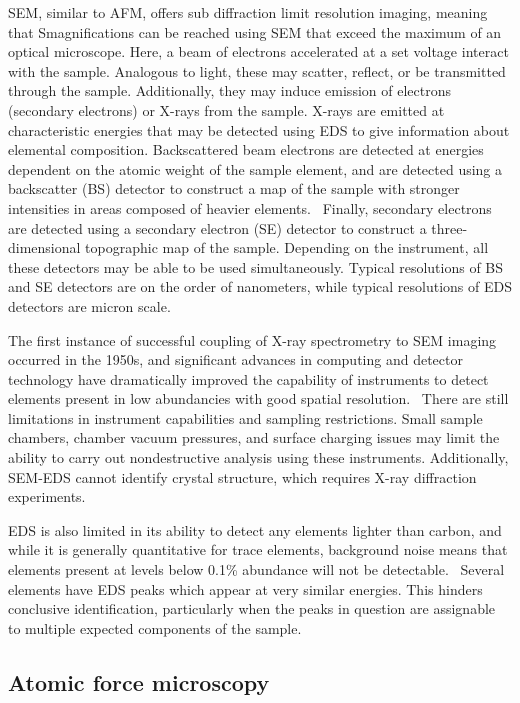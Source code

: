 SEM, similar to AFM, offers sub diffraction limit resolution imaging, meaning that Smagnifications can be reached using SEM that exceed the maximum of an optical microscope. Here, a beam of electrons accelerated at a set voltage interact with the sample. Analogous to light, these may scatter, reflect, or be transmitted through the sample. Additionally, they may induce emission of electrons (secondary electrons) or X-rays from the sample. X-rays are emitted at characteristic energies that may be detected using EDS to give information about elemental composition. Backscattered beam electrons are detected at energies dependent on the atomic weight of the sample element, and are detected using a backscatter (BS) detector to construct a map of the sample with stronger intensities in areas composed of heavier elements.~\autocite{Lazzara,Pradell,Schreiner} Finally, secondary electrons are detected using a secondary electron (SE) detector to construct a three-dimensional topographic map of the sample. Depending on the instrument, all these detectors may be able to be used simultaneously. Typical resolutions of BS and SE detectors are on the order of nanometers, while typical resolutions of EDS detectors are micron scale.~\autocite{Lazzara}

The first instance of successful coupling of X-ray spectrometry to SEM imaging occurred in the 1950s, and significant advances in computing and detector technology have dramatically improved the capability of instruments to detect elements present in low abundancies with good spatial resolution.~\autocite{Schreiner} There are still limitations in instrument capabilities and sampling restrictions. Small sample chambers, chamber vacuum pressures, and surface charging issues may limit the ability to carry out nondestructive analysis using these instruments. Additionally, SEM-EDS cannot identify crystal structure, which requires X-ray diffraction experiments.~\autocite{Lazzara,Schreiner} 

EDS is also limited in its ability to detect any elements lighter than carbon, and while it is generally quantitative for trace elements, background noise means that elements present at levels below 0.1\% abundance will not be detectable.~\autocite{Schreiner,Pradell,Lazzara} Several elements have EDS peaks which appear at very similar energies. This hinders conclusive identification, particularly when the peaks in question are assignable to multiple expected components of the sample. 


\subsection[Atomic force microscopy]{Atomic force microscopy}
\label{subsection1.2.3}

